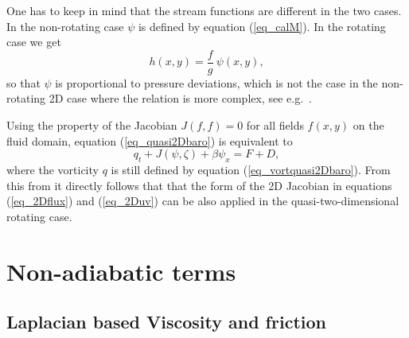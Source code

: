 One has to keep in mind that the stream functions are different in 
the two cases. In the non-rotating case $\psi$ is defined by 
equation (\ref{eq_calM}). In the rotating case we get 
\begin{equation} \label{eq_hquasi2Dbaropsi}
  h(x,y) = \frac{f}{g} \ \psi(x,y),    
\end{equation} 
so that $\psi$ is proportional to pressure deviations, which is not 
the case in the non-rotating 2D case where the relation is more
complex, see e.g.\ \cite{johnstonandliu2004}.

Using the property of the Jacobian $J(f,f) = 0$ for all fields
$f(x,y)$ on the fluid domain, equation (\ref{eq_quasi2Dbaro})
is equivalent to
\begin{equation} \label{eq_quasi2Dbarozeta}
  q_{t} + J(\psi,\zeta) + \beta \psi_{x} = F + D,
\end{equation}
where the vorticity $q$ is still defined by equation 
(\ref{eq_vortquasi2Dbaro}). From this from it directly follows that
that the form of the 2D Jacobian in equations 
(\ref{eq_2Dflux}) and (\ref{eq_2Duv}) can be also applied in the 
quasi-two-dimensional rotating case.

\section{Non-adiabatic terms}

\subsection{Laplacian based Viscosity and friction}

